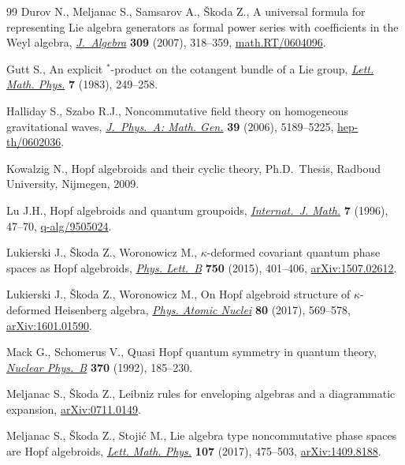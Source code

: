\documentclass[10pt,a4paper]{amsart}
\numberwithin{equation}{section}
\begin{document}
\begin{thebibliography}{99}
Durov N., Meljanac S., Samsarov A., \v{S}koda Z., A universal formula for
 representing {L}ie algebra generators as formal power series with
 coefficients in the {W}eyl algebra, \href{https://doi.org/10.1016/j.jalgebra.2006.08.025}{\textit{J.~Algebra}} \textbf{309} (2007),
 318--359, \href{https://arxiv.org/abs/math.RT/0604096}{math.RT/0604096}.

Gutt S., An explicit {$^{\ast} $}-product on the cotangent bundle of a {L}ie
 group, \href{https://doi.org/10.1007/BF00400441}{\textit{Lett. Math. Phys.}} \textbf{7} (1983), 249--258.

Halliday S., Szabo R.J., Noncommutative field theory on homogeneous
 gravitational waves, \href{https://doi.org/10.1088/0305-4470/39/18/030}{\textit{J.~Phys.~A: Math. Gen.}} \textbf{39} (2006),
 5189--5225, \href{https://arxiv.org/abs/hep-th/0602036}{hep-th/0602036}.

Kowalzig N., Hopf algebroids and their cyclic theory, Ph.D.~Thesis, Radboud
 University, Nijmegen, 2009.

Lu J.H., Hopf algebroids and quantum groupoids, \href{https://doi.org/10.1142/S0129167X96000050}{\textit{Internat.~J. Math.}}
 \textbf{7} (1996), 47--70, \href{https://arxiv.org/abs/q-alg/9505024}{q-alg/9505024}.

Lukierski J., \v{S}koda Z., Woronowicz M., {$\kappa$}-deformed covariant
 quantum phase spaces as {H}opf algebroids, \href{https://doi.org/10.1016/j.physletb.2015.09.042}{\textit{Phys. Lett.~B}}
 \textbf{750} (2015), 401--406, \href{https://arxiv.org/abs/1507.02612}{arXiv:1507.02612}.

Lukierski J., \v{S}koda Z., Woronowicz M., On {H}opf algebroid structure of
 $\kappa$-deformed {H}eisenberg algebra, \href{https://doi.org/10.1134/S1063778817030188}{\textit{Phys. Atomic Nuclei}}
 \textbf{80} (2017), 569--578, \href{https://arxiv.org/abs/1601.01590}{arXiv:1601.01590}.

Mack G., Schomerus V., Quasi {H}opf quantum symmetry in quantum theory,
 \href{https://doi.org/10.1016/0550-3213(92)90350-K}{\textit{Nuclear Phys.~B}} \textbf{370} (1992), 185--230.

Meljanac S., \v{S}koda Z., Leibniz rules for enveloping algebras and a
 diagrammatic expansion, \href{https://arxiv.org/abs/0711.0149}{arXiv:0711.0149}.

Meljanac S., \v{S}koda Z., Stoji\'c M., Lie algebra type noncommutative phase
 spaces are {H}opf algebroids, \href{https://doi.org/10.1007/s11005-016-0908-9}{\textit{Lett. Math. Phys.}} \textbf{107} (2017),
 475--503, \href{https://arxiv.org/abs/1409.8188}{arXiv:1409.8188}.


\end{thebibliography}
\end{document}
